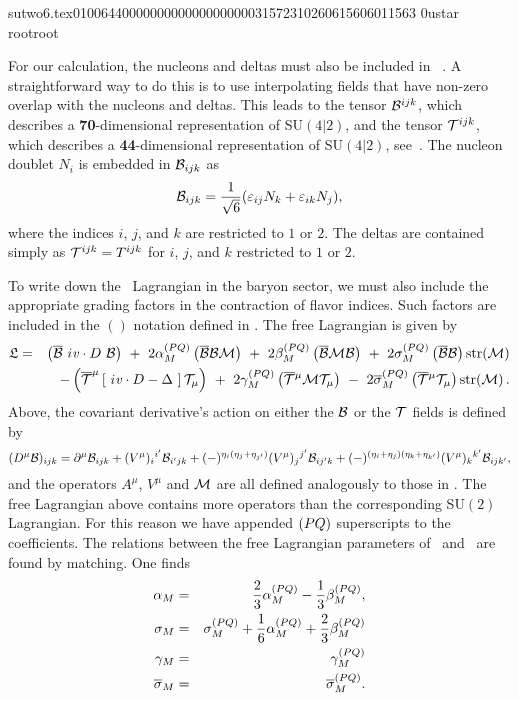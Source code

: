                                                                                                                                                                                                                                                                                       sutwo6.tex                                                                                          0100644 0000000 0000000 00000315723 10260615606 011563  0                                                                                                    ustar   root                            root                                                                                                                                                                                                                   \documentclass[prd,amssymb,amsmath,showpacs,nofootinbib,superscriptaddress]{revtex4}
\begin{document}
For our calculation, the nucleons and deltas must also be included in
\PQCPT~\cite{Chen:2001yi,Beane:2002vq}. 
A straightforward way to do this is to use interpolating fields that have 
non-zero overlap with the nucleons and deltas. This leads to the tensor
${\mathcal B}^{ijk}$, which describes a {\bf 70}-dimensional representation of SU$(4|2)$, 
and the tensor ${\mathcal T}^{ijk}$, which describes a {\bf 44}-dimensional representation 
of SU$(4|2)$, see~\cite{Beane:2002vq}.  
The nucleon doublet $N_i$ is embedded in ${\mathcal B}_{ijk}$ as
\begin{equation}
{\mathcal B}_{ijk} = \frac{1}{\sqrt{6}} (\varepsilon_{ij} N_k + \varepsilon_{ik} N_j )
,\end{equation}
where the indices $i$, $j$, and $k$ are restricted to $1$ or $2$. The deltas
are contained simply as ${\mathcal T}^{ijk} = T^{ijk}$ for $i$, $j$, and $k$ restricted
to $1$ or $2$. 







To write down the \PQCPT\ Lagrangian in the baryon sector, we must also include
the appropriate grading factors in the contraction of flavor indices. Such factors
are included in the $()$ notation defined in \cite{Labrenz:1996jy,Beane:2002vq}.
The free Lagrangian is given by
\begin{eqnarray}
  \mathfrak{L} &=&
    \left( \ol{\c{B}}\ i\vD\ \c{B} \right)\ 
    +\ 2\am^{\pq} \left( \ol{\c{B}} \c{B} \c{M} \right)\ 
    +\ 2\bm^{\pq} \left( \ol{\c{B}} \c{M} \c{B} \right)\ 
    +\ 2\smb^{\pq} \left( \ol{\c{B}} \c{B} \right) \str(\c{M})
\nonumber\\
 && -
    \left(\ol{\c{T}}^{\mu}\left[\ i\vD - \Delta\ \right] \c{T}_\mu \right)\ 
    +\ 2 \gm^{\pq} \left(\ol{\c{T}}{}^\mu \c{M} \c{T}_\mu \right)\ 
    -\ 2 \smt^{\pq} \left(\ol{\c{T}}{}^\mu \c{T}_\mu \right) \str (\c{M})
\label{eq:leadlagPQ}\,
.\end{eqnarray} 
Above, the covariant derivative's action on either the ${\mathcal B}$ or the ${\mathcal T}$ fields
is defined by
\begin{equation}
(D^\mu {\mathcal B})_{ijk} = \partial^\mu {\mathcal B}_{ijk} + (V^\mu)_{i}{}^{i'} {\mathcal B}_{i'jk} 
+ (-)^{\eta_i(\eta_j + \eta_{j'})} (V^\mu)_{j}{}^{j'} {\mathcal B}_{ij'k} 
+  (-)^{(\eta_i + \eta_j)(\eta_k + \eta_{k'})} (V^\mu)_{k}{}^{k'} {\mathcal B}_{ijk'}
,\end{equation}
and the operators $A^\mu$, $V^\mu$ and ${\mathcal M}$ are all defined analogously 
to those in \CPT. 
The free Lagrangian above contains more operators than the corresponding SU$(2)$ Lagrangian. 
For this reason we have appended $(PQ)$ superscripts to the coefficients. 
The relations between the free Lagrangian parameters of \PQCPT\
and \CPT\ are found by matching. One finds
\begin{eqnarray}
{\alpha}_M &=& \frac{2}{3} {\alpha}_M^{(PQ)} - \frac{1}{3} {\beta}_M^{(PQ)},  \\
\sigma_M &=& \sigma_M^{(PQ)} + \frac{1}{6} {\alpha}_M^{(PQ)} + \frac{2}{3} {\beta}_M^{(PQ)} \\
\gamma_M &=& \gamma_M^{(PQ)} \\
{\overline{\sigma}}_M &=& {\overline{\sigma}}_M^{(PQ)}
.\end{eqnarray}
\end{document}
